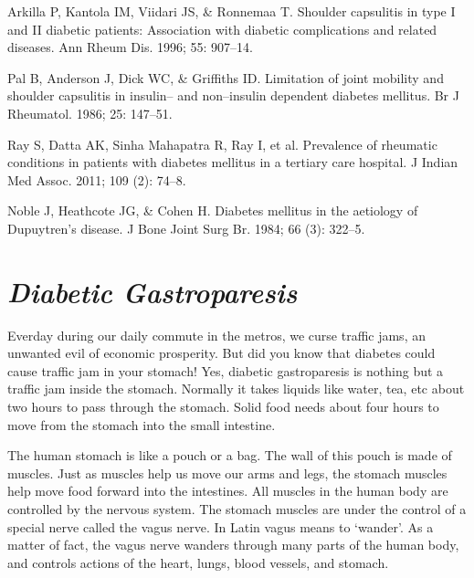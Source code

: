 \begin{thebibliography}{99}
 Arkilla P, Kantola IM, Viidari JS, \& Ronnemaa T. Shoulder capsulitis in type I and II diabetic patients: Association with diabetic complications and related diseases. Ann Rheum Dis. 1996; 55: 907–14.

  Pal B, Anderson J, Dick WC, \& Griffiths ID. Limitation of joint mobility and shoulder capsulitis in insulin– and non–insulin dependent diabetes mellitus. Br J Rheumatol. 1986; 25: 147–51.

  Ray S, Datta AK, Sinha Mahapatra R, Ray I, et al. Prevalence of rheumatic conditions in patients with diabetes mellitus in a tertiary care hospital. J Indian Med Assoc. 2011; 109 (2): 74–8.

  Noble J, Heathcote JG, \& Cohen H. Diabetes mellitus in the aetiology of Dupuytren’s disease. J Bone Joint Surg Br. 1984; 66 (3): 322–5.

 \end{thebibliography}


\chapter{\textit{Diabetic Gastroparesis}}\label{chap20}

Everday during our daily commute in the metros, we curse traffic jams, an unwanted evil of economic prosperity. But did you know that diabetes could cause traffic jam in your stomach! Yes, diabetic gastroparesis is nothing but a traffic jam inside the stomach. Normally it takes liquids like water, tea, etc about two hours to pass through the stomach. Solid food needs about four hours to move from the stomach into the small intestine.

The human stomach is like a pouch or a bag. The wall of this pouch is made of muscles. Just as muscles help us move our arms and legs, the stomach muscles help move food forward into the intestines. All muscles in the human body are controlled by the nervous system. The stomach muscles are under the control of a special nerve called the vagus nerve. In Latin vagus means to ‘wander’. As a matter of fact, the vagus nerve wanders through many parts of the human body, and controls actions of the heart, lungs, blood vessels, and stomach.

